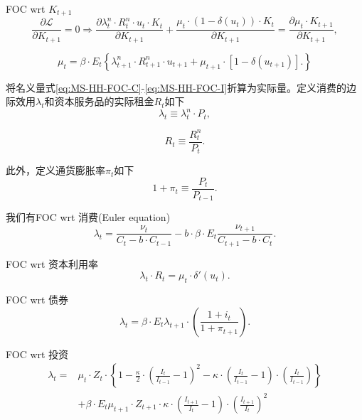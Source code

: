 FOC wrt $K_{t+1}$
\begin{equation*}
\frac{\partial \mathcal{L}}{\partial K_{t+1}} = 0 \Rightarrow \frac{\partial \lambda^n_t \cdot R^n_t \cdot u_t \cdot K_t}{\partial K_{t+1}} + \frac{\mu_t \cdot \left(1-\delta(u_t)\right) \cdot K_t}{\partial K_{t+1}} = \frac{\partial \mu_t \cdot K_{t+1}}{\partial K_{t+1}},
\end{equation*}

\begin{equation}
\label{eq:MS-HH-FOC-K}
\mu_t = \beta \cdot E_t \left\{
  \lambda^n_{t+1} \cdot R^n_{t+1} \cdot u_{t+1} + \mu_{t+1} \cdot \left[1-\delta(u_{t+1})\right].
\right\}
\end{equation}

将名义量式\eqref{eq:MS-HH-FOC-C}-\eqref{eq:MS-HH-FOC-I}折算为实际量。定义消费的边际效用$\lambda_t$和资本服务品的实际租金$R_t$如下
\begin{equation}
\label{eq:MS-lambda-n-lambda}
\lambda_t \equiv \lambda^n_t \cdot P_t,
\end{equation}

\begin{equation}
\label{eq:MS-R-n-R}
R_t \equiv \frac{R^n_t}{P_t}.
\end{equation}

此外，定义通货膨胀率$\pi_t$如下
\begin{equation}
\label{eq:MS-inflation-definication}
1+\pi_t \equiv \frac{P_{t}}{P_{t-1}}.
\end{equation}

我们有FOC wrt 消费(Euler equation)
\begin{equation}
\label{eq:MS-HH-FOC-C-real}
\lambda_t = \frac{\nu_t}{C_t - b \cdot C_{t-1}} - b \cdot \beta \cdot E_t \frac{\nu_{t+1}}{C_{t+1} - b \cdot C_{t}}.
\end{equation}

FOC wrt 资本利用率
\begin{equation}
\label{eq:MS-HH-FOC-u-real}
\lambda_t \cdot R_t = \mu_t \cdot \delta'(u_t).
\end{equation}

FOC wrt 债券
\begin{equation}
\label{eq:MS-HH-FOC-B-real}
\lambda_t = \beta \cdot E_{t} \lambda_{t+1} \cdot \left(\frac{1+i_t}{1+\pi_{t+1}}\right).
\end{equation}

FOC wrt 投资
\begin{equation}
\label{eq:MS-HH-FOC-I-real}
\begin{split}
\lambda_t = &\mu_t \cdot Z_t \cdot \left\{
  1 - \frac{\kappa}{2} \cdot \left(\frac{I_t}{I_{t-1}} -1\right)^2 - \kappa \cdot \left(\frac{I_t}{I_{t-1}} -1 \right) \cdot \left(\frac{I_t}{I_{t-1}} \right)
\right\} \\
&+ \beta \cdot E_t \mu_{t+1} \cdot Z_{t+1} \cdot \kappa \cdot \left(\frac{I_{t+1}}{I_{t}} -1 \right) \cdot \left(\frac{I_{t+1}}{I_{t}}\right)^2
\end{split}
\end{equation}

